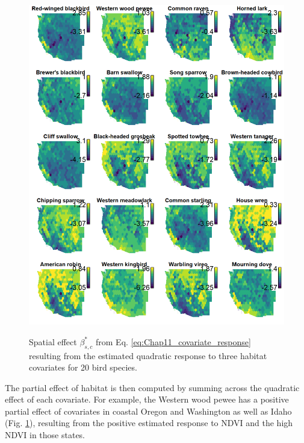 \begin{figure}[!ht]
    \caption[Partial effect of covariates for 20 bird species]{Spatial effect \(\beta_{s,c}^*\) from Eq. \ref{eq:Chap11_covariate_response} resulting from the estimated quadratic response to three habitat covariates for 20 bird species.}
    \includegraphics[width=5.5in]{Chap_11/Habitat.png}
    \label{fig:Chap11_habitat_response}
\end{figure}

The partial effect of habitat is then computed by summing across the quadratic effect of each covariate.  For example, the Western wood pewee has a positive partial effect of covariates in coastal Oregon and Washington as well as Idaho (Fig. \ref{fig:Chap11_habitat_response}), resulting from the positive estimated response to NDVI and the high NDVI in those states.     

